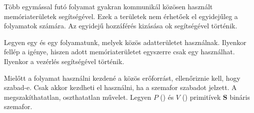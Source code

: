 \documentclass[main.tex]{subfiles}
\begin{document}
  Több egymással  futó folyamat gyakran
  kommunikál közösen használt memóriaterületek segítségével.
  Ezek a területek nem érhetőek el egyidejűleg a folyamatok
  számára. Az egyidejű hozzáférés kizásása ok
  segítségével történik.
  
  
  Legyen egy  és egy  folyamatunk,
  melyek közös adatterületet használnak. Ilyenkor fellép a
   igénye, hiszen adott memóriaterületet
  egyszerre csak egy  használhat. Ilyenkor a
  vezérlés  segítségével történik.

  \begin{figure}[H]
    \centering
  \end{figure}
  
  Mielőtt a folyamat használni kezdené a közös erőforrást,
  ellenőriznie kell, hogy szabad-e. Csak akkor kezdheti el
  használni, ha a szemafor szabadot jelzett.
  A  megszakíthatatlan, oszthatatlan művelet.
  Legyen $P$ () és $V$ ()
  primitívek $\mathbf{S}$ bináris szemafor.
\end{document}
